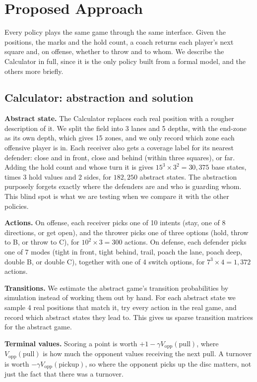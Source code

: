 \documentclass[conference]{IEEEtran}
\begin{document}
\section{Proposed Approach}
Every policy plays the same game through the same interface. Given the positions, the marks and the hold count, a coach returns each player's next square and, on offense, whether to throw and to whom. We describe the Calculator in full, since it is the only policy built from a formal model, and the others more briefly.

\subsection{Calculator: abstraction and solution}
\textbf{Abstract state.} The Calculator replaces each real position with a rougher description of it. We split the field into 3 lanes and 5 depths, with the end-zone as its own depth, which gives 15 zones, and we only record which zone each offensive player is in. Each receiver also gets a coverage label for its nearest defender: close and in front, close and behind (within three squares), or far. Adding the hold count and whose turn it is gives $15^3\times3^2=30{,}375$ base states, times 3 hold values and 2 sides, for $182{,}250$ abstract states. The abstraction purposely forgets exactly where the defenders are and who is guarding whom. This blind spot is what we are testing when we compare it with the other policies.

\textbf{Actions.} On offense, each receiver picks one of 10 intents (stay, one of 8 directions, or get open), and the thrower picks one of three options (hold, throw to B, or throw to C), for $10^2\times3=300$ actions. On defense, each defender picks one of 7 modes (tight in front, tight behind, trail, poach the lane, poach deep, double B, or double C), together with one of 4 switch options, for $7^3\times4=1{,}372$ actions.

\textbf{Transitions.} We estimate the abstract game's transition probabilities by simulation instead of working them out by hand. For each abstract state we sample 4 real positions that match it, try every action in the real game, and record which abstract states they lead to. This gives us sparse transition matrices for the abstract game.

\textbf{Terminal values.} Scoring a point is worth $+1-\gamma V_{\text{opp}}(\text{pull})$, where $V_{\text{opp}}(\text{pull})$ is how much the opponent values receiving the next pull. A turnover is worth $-\gamma V_{\text{opp}}(\text{pickup})$, so where the opponent picks up the disc matters, not just the fact that there was a turnover.
\end{document}

